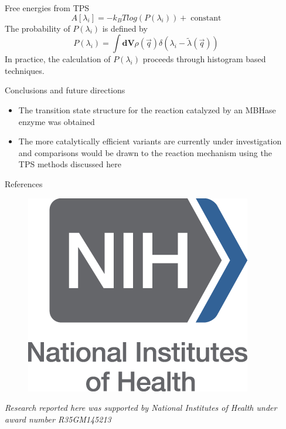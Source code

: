 \documentclass[final]{beamer}
\newlength{\sepwidth}
\newlength{\colwidth}
\newcommand{\separatorcolumn}{\begin{column}{\sepwidth}\end{column}}
\begin{document}
\begin{frame}[t]
\begin{columns}[t]
\begin{column}{\colwidth}
\begin{block}{Free energies from TPS}
\begin{equation}
A[\lambda_i] = -k_BTlog(P(\lambda_i)) +\;\text{constant} \nonumber 
\end{equation}
The probability of $P(\lambda_i)$ is defined by
\begin{equation}
P(\lambda_i) = \int \textbf{dV} \rho({\vec{q}})\delta(\lambda_i-\tilde{\lambda}(\vec{q})) \nonumber 
\end{equation}
In practice, the calculation of $P(\lambda_i)$ proceeds through histogram based techniques.
  \end{block}
\begin{block}{Conclusions and future directions}
\begin{itemize}
    \item The transition state structure for the reaction catalyzed by an MBHase enzyme was obtained
    \item The more catalytically efficient variants are currently under investigation and comparisons 
    would be drawn to the reaction mechanism using the TPS methods discussed here 
\end{itemize}
    
  \end{block}
  \begin{block}{References}

    \nocite{*}
    \footnotesize{}
\begin{figure}
\centering
\includegraphics[scale=0.5]{figures/nih.png}
\end{figure}
\emph{Research reported here was supported by National Institutes of Health under award number R35GM145213}
  \end{block}



\end{column}

\separatorcolumn
\end{columns}
\end{frame}
\end{document}
